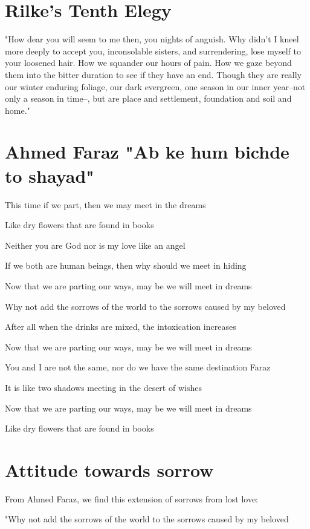 \documentclass{amsart}
\begin{document}
\section{Rilke's Tenth Elegy}

"How dear you will seem to me then, you nights of anguish.  Why didn't I kneel more deeply to accept you, inconsolable sisters, and surrendering, lose myself to your loosened hair.  How we squander our hours of pain.  How we gaze beyond them into the bitter duration to see if they have an end.  Though they are really our winter enduring foliage, our dark evergreen, one season in our inner year--not only a season in time--, but are place and settlement, foundation and soil and home."

\section{Ahmed Faraz "Ab ke hum bichde to shayad"}

This time if we part, then we may meet in the dreams

Like dry flowers that are found in books

Neither you are God nor is my love like an angel

If we both are human beings, then why should we meet in hiding

Now that we are parting our ways, may be we will meet in dreams

Why not add the sorrows of the world to the sorrows caused by my beloved

After all when the drinks are mixed, the intoxication increases

Now that we are parting our ways, may be we will meet in dreams

You and I are not the same, nor do we have the same destination Faraz

It is like two shadows meeting in the desert of wishes

Now that we are parting our ways, may be we will meet in dreams

Like dry flowers that are found in books

\section{Attitude towards sorrow}

From Ahmed Faraz, we find this extension of sorrows from lost love:

"Why not add the sorrows of the world to the sorrows caused by my beloved
\end{document}
